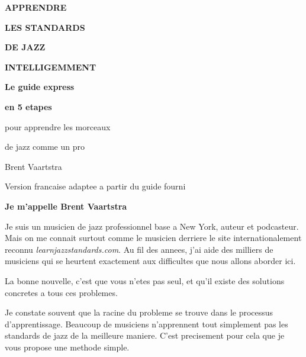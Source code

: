 \documentclass[11pt,a4paper]{article}
\begin{document}
\color{ink}

\begin{titlepage}
\pagecolor{dark}
\color{white}
\thispagestyle{empty}

\vspace*{1.5cm}
{\fontsize{21}{24}\selectfont\bfseries APPRENDRE}

\vspace{0.15cm}
{\fontsize{30}{33}\selectfont\bfseries LES STANDARDS}

\vspace{0.1cm}
{\fontsize{30}{33}\selectfont\bfseries DE JAZZ}

\vspace{0.1cm}
{\fontsize{21}{24}\selectfont\bfseries INTELLIGEMMENT}

\vfill

{\fontsize{34}{38}\selectfont\bfseries Le guide express}

\vspace{0.2cm}
{\fontsize{26}{30}\selectfont\bfseries en 5 etapes}

\vspace{0.5cm}
{\Large pour apprendre les morceaux}

\vspace{0.15cm}
{\Large de jazz comme un pro}

\vfill

{\Large Brent Vaartstra}

\vspace{0.8cm}
{\normalsize Version francaise adaptee a partir du guide fourni}
\end{titlepage}

\nopagecolor
\color{ink}
\setcounter{page}{1}

{\huge\bfseries Je m'appelle Brent Vaartstra}

\vspace{0.5em}

Je suis un musicien de jazz professionnel base a New York, auteur et podcasteur.
Mais on me connait surtout comme le musicien derriere le site internationalement reconnu
\textit{learnjazzstandards.com}. Au fil des annees, j'ai aide des milliers de musiciens qui
se heurtent exactement aux difficultes que nous allons aborder ici.

La bonne nouvelle, c'est que vous n'etes pas seul, et qu'il existe des solutions concretes
a tous ces problemes.

Je constate souvent que la racine du probleme se trouve dans le processus d'apprentissage.
Beaucoup de musiciens n'apprennent tout simplement pas les standards de jazz de la meilleure
maniere. C'est precisement pour cela que je vous propose une methode simple.
\end{document}
